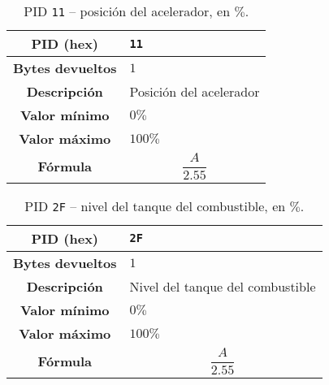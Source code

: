 \begin{table}[H]
  \centering
  \begin{tabularx}{\textwidth}{|c|X|}
    \hline
    \textbf{PID (hex)}       & \texttt{11}                    \\
    \hline
    \textbf{Bytes devueltos} & $1$                            \\
    \hline
    \textbf{Descripción}     & Posición del acelerador \\
    \hline
    \textbf{Valor mínimo}    & $0\%$                          \\
    \hline
    \textbf{Valor máximo}    & $100\%$                        \\
    \hline
    \textbf{Fórmula}         &                                %
    \begin{equation*}
      \frac{A}{2.55}
    \end{equation*}                                 \\
    \hline
  \end{tabularx}
  \caption{\ac{PID} \texttt{11} -- posición del acelerador, en $\%$.}
\end{table}

\begin{table}[H]
  \centering
  \begin{tabularx}{\textwidth}{|c|X|}
    \hline
    \textbf{PID (hex)}       & \texttt{2F}                    \\
    \hline
    \textbf{Bytes devueltos} & $1$                            \\
    \hline
    \textbf{Descripción}     & Nivel del tanque del combustible \\
    \hline
    \textbf{Valor mínimo}    & $0\%$                          \\
    \hline
    \textbf{Valor máximo}    & $100\%$                        \\
    \hline
    \textbf{Fórmula}         &                                %
    \begin{equation*}
      \frac{A}{2.55}
    \end{equation*}                                 \\
    \hline
  \end{tabularx}
  \caption{\ac{PID} \texttt{2F} -- nivel del tanque del combustible, en $\%$.}
\end{table}

